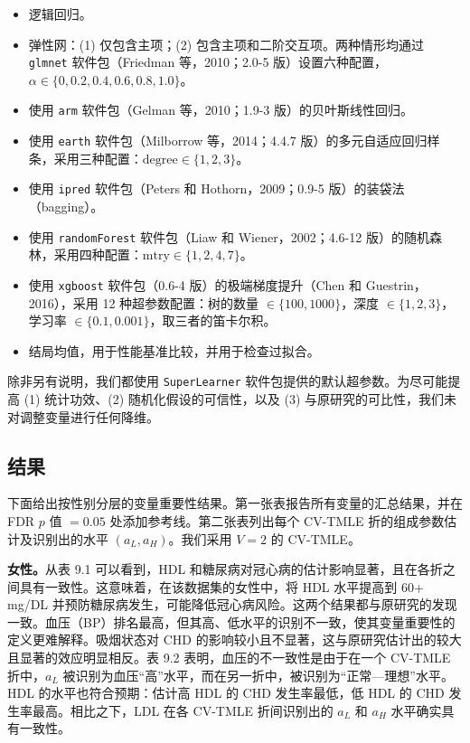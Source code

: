 \begin{itemize}
\item 逻辑回归。
\item 弹性网：(1) 仅包含主项；(2) 包含主项和二阶交互项。两种情形均通过 \texttt{glmnet} 软件包（Friedman 等，2010；2.0-5 版）设置六种配置，$\alpha\in\{0,0.2,0.4,0.6,0.8,1.0\}$。
\item 使用 \texttt{arm} 软件包（Gelman 等，2010；1.9-3 版）的贝叶斯线性回归。
\item 使用 \texttt{earth} 软件包（Milborrow 等，2014；4.4.7 版）的多元自适应回归样条，采用三种配置：$\mathrm{degree}\in\{1,2,3\}$。
\item 使用 \texttt{ipred} 软件包（Peters 和 Hothorn，2009；0.9-5 版）的装袋法（bagging）。
\item 使用 \texttt{randomForest} 软件包（Liaw 和 Wiener，2002；4.6-12 版）的随机森林，采用四种配置：$\mathrm{mtry}\in\{1,2,4,7\}$。
\item 使用 \texttt{xgboost} 软件包（0.6-4 版）的极端梯度提升（Chen 和 Guestrin，2016），采用 12 种超参数配置：树的数量 $\in\{100,1000\}$，深度 $\in\{1,2,3\}$，学习率 $\in\{0.1,0.001\}$，取三者的笛卡尔积。
\item 结局均值，用于性能基准比较，并用于检查过拟合。
\end{itemize}

除非另有说明，我们都使用 \texttt{SuperLearner} 软件包提供的默认超参数。为尽可能提高 (1) 统计功效、(2) 随机化假设的可信性，以及 (3) 与原研究的可比性，我们未对调整变量进行任何降维。

\subsection{结果}

下面给出按性别分层的变量重要性结果。第一张表报告所有变量的汇总结果，并在 FDR $p$ 值 $=0.05$ 处添加参考线。第二张表列出每个 CV-TMLE 折的组成参数估计及识别出的水平 $(a_L,a_H)$。我们采用 $V=2$ 的 CV-TMLE。

\noindent\textbf{女性。}从表 9.1 可以看到，HDL 和糖尿病对冠心病的估计影响显著，且在各折之间具有一致性。这意味着，在该数据集的女性中，将 HDL 水平提高到 60+ mg/DL 并预防糖尿病发生，可能降低冠心病风险。这两个结果都与原研究的发现一致。血压（BP）排名最高，但其高、低水平的识别不一致，使其变量重要性的定义更难解释。吸烟状态对 CHD 的影响较小且不显著，这与原研究估计出的较大且显著的效应明显相反。表 9.2 表明，血压的不一致性是由于在一个 CV-TMLE 折中，$a_L$ 被识别为血压“高”水平，而在另一折中，被识别为“正常—理想”水平。HDL 的水平也符合预期：估计高 HDL 的 CHD 发生率最低，低 HDL 的 CHD 发生率最高。相比之下，LDL 在各 CV-TMLE 折间识别出的 $a_L$ 和 $a_H$ 水平确实具有一致性。

